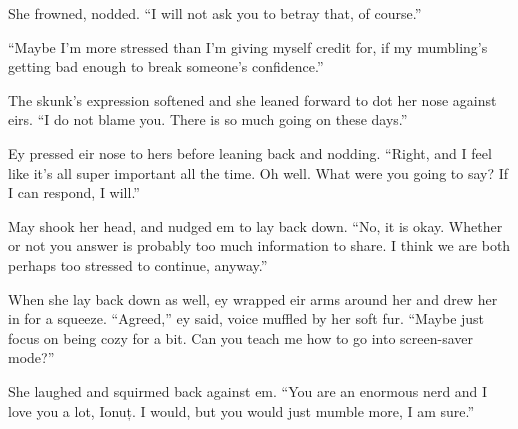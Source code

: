 She frowned, nodded. ``I will not ask you to betray that, of course.''

``Maybe I'm more stressed than I'm giving myself credit for, if my mumbling's getting bad enough to break someone's confidence.''

The skunk's expression softened and she leaned forward to dot her nose against eirs. ``I do not blame you. There is so much going on these days.''

Ey pressed eir nose to hers before leaning back and nodding. ``Right, and I feel like it's all super important all the time. Oh well. What were you going to say? If I can respond, I will.''

May shook her head, and nudged em to lay back down. ``No, it is okay. Whether or not you answer is probably too much information to share. I think we are both perhaps too stressed to continue, anyway.''

When she lay back down as well, ey wrapped eir arms around her and drew her in for a squeeze. ``Agreed,'' ey said, voice muffled by her soft fur. ``Maybe just focus on being cozy for a bit. Can you teach me how to go into screen-saver mode?''

She laughed and squirmed back against em. ``You are an enormous nerd and I love you a lot, Ionuț. I would, but you would just mumble more, I am sure.''
